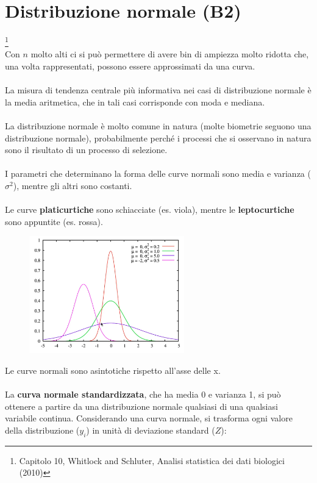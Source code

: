 \documentclass[10pt, draft]{book}
\begin{document}
\chapter{Distribuzione normale (B2)} \footnote{Capitolo 10, Whitlock and Schluter, Analisi statistica dei dati biologici (2010)}
\\
Con $n$ molto alti ci si può permettere di avere bin di ampiezza molto ridotta che, una volta rappresentati, possono essere approssimati da una curva.
\\
\\
La misura di tendenza centrale più informativa nei casi di distribuzione normale è la media aritmetica, che in tali casi corrisponde con moda e mediana.
\\
\\
La distribuzione normale è molto comune in natura (molte biometrie seguono una distribuzione normale), probabilmente perché i processi che si osservano in natura sono il risultato di un processo di selezione.
\\
\\
I parametri che determinano la forma delle curve normali sono media e varianza ($\sigma^2$), mentre gli altri sono costanti.
\\
\\
Le curve \textbf{platicurtiche} sono schiacciate (es. viola), mentre le  \textbf{leptocurtiche} sono appuntite (es. rossa).
\begin{figure}[h]\label{normalcurvetypes}
    \centering
    \includegraphics[width=0.6\textwidth]{normalcurvetypes}
    \caption{\small{}}
\end{figure}
Le curve normali sono asintotiche rispetto all’asse delle x.
\\
\\
La \textbf{curva normale standardizzata}, che ha media 0 e varianza 1, si può ottenere a partire da una distribuzione normale qualsiasi di una qualsiasi variabile continua. Considerando una curva normale, si trasforma ogni valore della distribuzione ($y_i$) in unità di deviazione standard ($Z$):
\end{document}

